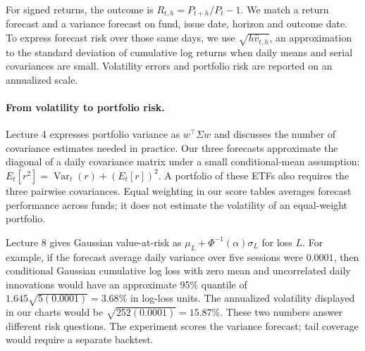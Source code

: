 \documentclass[11pt]{article}
\begin{document}
For signed returns, the outcome is $R_{t,h}=P_{t+h}/P_t-1$. We match a return forecast and a variance forecast on fund, issue date, horizon and outcome date. To express forecast risk over those same days, we use $\sqrt{h\widehat v_{t,h}}$, an approximation to the standard deviation of cumulative log returns when daily means and serial covariances are small. Volatility errors and portfolio risk are reported on an annualized scale.

\paragraph{From volatility to portfolio risk.} Lecture 4 expresses portfolio variance as $w^\top\Sigma w$ and discusses the number of covariance estimates needed in practice. Our three forecasts approximate the diagonal of a daily covariance matrix under a small conditional-mean assumption: $E_t[r^2]=\operatorname{Var}_t(r)+(E_t[r])^2$. A portfolio of these ETFs also requires the three pairwise covariances. Equal weighting in our score tables averages forecast performance across funds; it does not estimate the volatility of an equal-weight portfolio.

Lecture 8 gives Gaussian value-at-risk as $\mu_L+\Phi^{-1}(\alpha)\sigma_L$ for loss $L$. For example, if the forecast average daily variance over five sessions were $0.0001$, then conditional Gaussian cumulative log loss with zero mean and uncorrelated daily innovations would have an approximate 95\% quantile of $1.645\sqrt{5(0.0001)}=3.68\%$ in log-loss units. The annualized volatility displayed in our charts would be $\sqrt{252(0.0001)}=15.87\%$. These two numbers answer different risk questions. The experiment scores the variance forecast; tail coverage would require a separate backtest.
\end{document}
